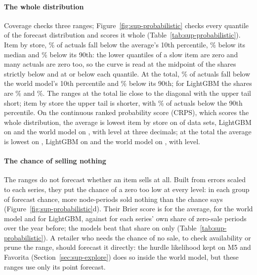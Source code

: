 \paragraph{The whole distribution} Coverage checks three ranges;
Figure~\ref{fig:sup-probabilistic} checks every quantile of the forecast
distribution and scores it whole (Table~\ref{tab:sup-probabilistic}). Item by
store, \sfRelTenAvg\% of actuals fall below the average's 10th percentile,
\sfRelHalfAvg\% below its median and \sfRelNinetyAvg\% below its 90th: the
lower quantiles of a slow item are zero and many actuals are zero too, so the
curve is read at the midpoint of the shares strictly below and at or below each
quantile. At the total, \sfRelTenTotWm\% of actuals fall below the world model's
10th percentile and \sfRelNinetyTotWm\% below its 90th; for LightGBM the shares
are \sfRelTenTotLgb\% and \sfRelNinetyTotLgb\%. The ranges at the total lie
close to the diagonal with the upper tail short; item by store the
upper tail is shorter, with \sfRelNinetyAvg\% of actuals below the 90th
percentile.
On the continuous ranked probability score (CRPS), which scores the whole
distribution, the average is lowest item by store on \sfCrpsAvgBestIxs{} of
\sfProbSets{} data sets, LightGBM on \sfCrpsLgbBestIxs{} and the world model on
\sfCrpsWmBestIxs{}, with \sfCrpsTieIxs{} level at three decimals; at the total the
average is lowest on \sfCrpsAvgBestTot{}, LightGBM on \sfCrpsLgbBestTot{} and the
world model on \sfCrpsWmBestTot{}, with \sfCrpsTieTot{} level.

\paragraph{The chance of selling nothing} The ranges do not forecast whether an
item sells at all. Built from errors scaled to each series, they put the chance
of a zero too low at every level: in each group of forecast chance, more
node-periods sold nothing than the chance says
(Figure~\ref{fig:sup-probabilistic}d). Their Brier score is
\sfBrierAvg{} for the average, \sfBrierWm{} for the world model and
\sfBrierLgb{} for LightGBM, against \sfBrierClim{} for each series' own share of
zero-sale periods over the year before; the models beat that share on
\sfBrierBeatsClimNames{} only (Table~\ref{tab:sup-probabilistic}). A retailer
who needs the chance of no sale, to check availability or prune the range,
should forecast it directly: the hurdle likelihood kept on M5 and Favorita
(Section~\ref{sec:sup-explore}) does so inside the world model, but these ranges
use only its point forecast.

